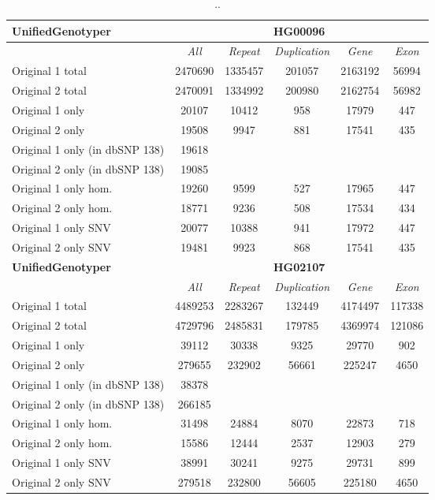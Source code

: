 \begin{table}[htb]
\begin{center}
\begin{tabular}{|l|c||c|c|c|c|}
\hline
{\bf UnifiedGenotyper} & \multicolumn{5}{|c|}{\bf HG00096} \\
\hline
\cline{2-6}
{\bf} & {\it All} & {\it Repeat} & {\it Duplication} & {\it Gene} & {\it Exon} \\
\hline
Original 1 total & 2470690 & 1335457 & 201057 & 2163192 & 56994\\ 
\hline
Original 2 total & 2470091 & 1334992 & 200980 & 2162754 & 56982\\ 
\hline
Original 1 only & 20107 & 10412 & 958 & 17979 & 447\\ 
\hline
Original 2 only & 19508 & 9947 & 881 & 17541 & 435\\ 
\hline
Original 1 only (in dbSNP 138) & 19618 &  &  &  & \\ 
\hline
Original 2 only (in dbSNP 138) & 19085 &  &  &  & \\ 
\hline
Original 1 only hom. & 19260 & 9599 & 527 & 17965 & 447\\ 
\hline
Original 2 only hom. & 18771 & 9236 & 508 & 17534 & 434\\ 
\hline
Original 1 only SNV & 20077 & 10388 & 941 & 17972 & 447\\ 
\hline
Original 2 only SNV & 19481 & 9923 & 868 & 17541 & 435\\ 
\hline
\hline
{\bf UnifiedGenotyper} & \multicolumn{5}{|c|}{\bf HG02107} \\
\hline
\cline{2-6}
{\bf} & {\it All} & {\it Repeat} & {\it Duplication} & {\it Gene} & {\it Exon} \\
\hline
Original 1 total & 4489253 & 2283267 & 132449 & 4174497 & 117338\\ 
\hline
Original 2 total & 4729796 & 2485831 & 179785 & 4369974 & 121086\\ 
\hline
Original 1 only & 39112 & 30338 & 9325 & 29770 & 902\\ 
\hline
Original 2 only & 279655 & 232902 & 56661 & 225247 & 4650\\ 
\hline
Original 1 only (in dbSNP 138) & 38378 &  &  &  & \\ 
\hline
Original 2 only (in dbSNP 138) & 266185 &  &  &  & \\ 
\hline
Original 1 only hom. & 31498 & 24884 & 8070 & 22873 & 718\\ 
\hline
Original 2 only hom. & 15586 & 12444 & 2537 & 12903 & 279\\ 
\hline
Original 1 only SNV & 38991 & 30241 & 9275 & 29731 & 899\\ 
\hline
Original 2 only SNV & 279518 & 232800 & 56605 & 225180 & 4650\\ 
\hline
\end{tabular}
\end{center}
\caption{ .. }
\label{tab:orig-vs-orig2-ug}
\end{table}

